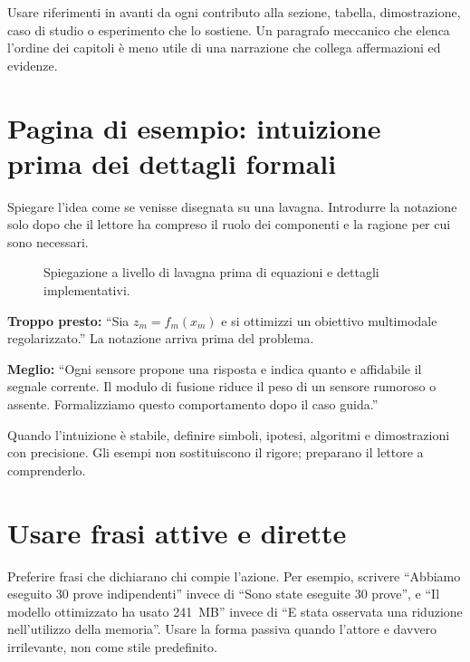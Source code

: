 Usare riferimenti in avanti da ogni contributo alla sezione, tabella,
dimostrazione, caso di studio o esperimento che lo sostiene. Un paragrafo
meccanico che elenca l'ordine dei capitoli è meno utile di una narrazione che
collega affermazioni ed evidenze.

\section{Pagina di esempio: intuizione prima dei dettagli formali}
Spiegare l'idea come se venisse disegnata su una lavagna. Introdurre la notazione
solo dopo che il lettore ha compreso il ruolo dei componenti e la ragione per
cui sono necessari.

\begin{figure}[htbp]
\centering
{}
\pipelinearrow
{}
\pipelinearrow
{}
\pipelinearrow
{}
\caption{Spiegazione a livello di lavagna prima di equazioni e dettagli implementativi.}
\label{fig:guide-intuition-it}
\end{figure}

\begin{keypoint}
\textbf{Troppo presto:} ``Sia $z_m=f_m(x_m)$ e si ottimizzi un obiettivo
multimodale regolarizzato.'' La notazione arriva prima del problema.\par
\textbf{Meglio:} ``Ogni sensore propone una risposta e indica quanto e affidabile
il segnale corrente. Il modulo di fusione riduce il peso di un sensore rumoroso
o assente. Formalizziamo questo comportamento dopo il caso guida.''
\end{keypoint}

Quando l'intuizione è stabile, definire simboli, ipotesi, algoritmi e
dimostrazioni con precisione. Gli esempi non sostituiscono il rigore; preparano
il lettore a comprenderlo.

\section{Usare frasi attive e dirette}
Preferire frasi che dichiarano chi compie l'azione. Per esempio, scrivere
``Abbiamo eseguito 30 prove indipendenti'' invece di ``Sono state eseguite 30
prove'', e ``Il modello ottimizzato ha usato 241~MB'' invece di ``E stata
osservata una riduzione nell'utilizzo della memoria''. Usare la forma passiva
quando l'attore e davvero irrilevante, non come stile predefinito.

